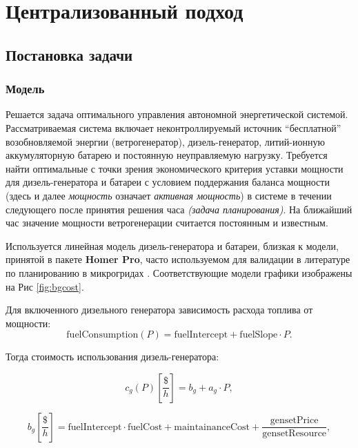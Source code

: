 \section{Централизованный подход}

\subsection{Постановка задачи}
\label{sec:planning_problem}
\subsubsection{Модель}

Решается задача оптимального управления автономной энергетической системой.\\
Рассматриваемая система включает неконтроллируемый источник ``бесплатной'' возобновляемой энергии  (ветрогенератор), дизель-генератор, литий-ионную аккумуляторную батарею и постоянную неуправляемую нагрузку.
Требуется найти оптимальные с точки зрения экономического критерия уставки мощности для дизель-генератора и батареи с условием поддержания баланса мощности (здесь и далее \textit{мощность} означает \textit{активная мощность}) в системе в течении следующего после принятия решения часа \textit{(задача планирования)}.
На ближайший час значение мощности ветрогенерации считается постоянным и известным.

Используется линейная модель дизель-генератора и батареи, близкая к модели, принятой в пакете \textbf{Homer Pro}, часто используемом для валидации в литературе по планированию в микрогридах \cite{Berendes2018, Aziz2019, Petersen2018, Olatomiwa2016}. 
Соответствующие модели графики изображены на Рис \ref{fig:bgcost}.

Для включенного дизельного генератора зависимость расхода топлива от мощности:
\begin{equation}
 \text{fuelConsumption} (P) = \text{fuelIntercept} + \text{fuelSlope} \cdot P.
\end{equation}

Тогда стоимость использования дизель-генератора:

\begin{equation}\label{f:cg}
c_g(P) \left[\frac{\$}{h} \right] = b_g + a_g \cdot P,
\end{equation}


\begin{equation}\label{f:bg}
b_g \left[\frac{\$}{h} \right] = 
\text{fuelIntercept} \cdot \text{fuelCost} + \text{maintainanceCost} +
\frac{\text{gensetPrice}}{\text{gensetResource}},
\end{equation}

